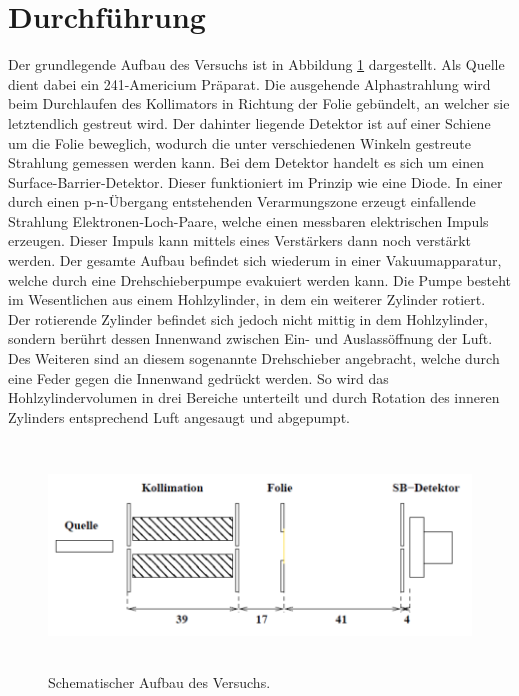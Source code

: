 \section{Durchführung}
\label{sec:Durchführung}

Der grundlegende Aufbau des Versuchs ist in Abbildung \ref{fig:aufbau} dargestellt.
Als Quelle dient dabei ein 241-Americium Präparat. Die ausgehende Alphastrahlung
wird beim Durchlaufen des Kollimators in Richtung der Folie gebündelt, an welcher
sie letztendlich gestreut wird. Der dahinter liegende Detektor ist auf einer Schiene
um die Folie beweglich, wodurch die unter verschiedenen Winkeln gestreute Strahlung
gemessen werden kann. Bei dem Detektor handelt es sich um einen Surface-Barrier-Detektor.
Dieser funktioniert im Prinzip wie eine Diode. In einer durch einen p-n-Übergang
entstehenden Verarmungszone erzeugt einfallende Strahlung Elektronen-Loch-Paare,
welche einen messbaren elektrischen Impuls erzeugen. Dieser Impuls kann mittels eines
Verstärkers dann noch verstärkt werden.
Der gesamte Aufbau befindet sich wiederum in einer Vakuumapparatur, welche
durch eine Drehschieberpumpe evakuiert werden kann. Die Pumpe besteht im Wesentlichen
aus einem Hohlzylinder, in dem ein weiterer Zylinder rotiert. Der rotierende Zylinder
befindet sich jedoch nicht mittig in dem Hohlzylinder, sondern berührt dessen Innenwand
zwischen Ein- und Auslassöffnung der Luft. Des Weiteren sind an diesem sogenannte
Drehschieber angebracht, welche durch eine Feder gegen die Innenwand gedrückt werden.
So wird das Hohlzylindervolumen in drei Bereiche unterteilt und durch Rotation des
inneren Zylinders entsprechend Luft angesaugt und abgepumpt.

\begin{figure}[H]
  \centering
  \includegraphics[height=6cm]{Aufbau.PNG}
  \caption{Schematischer Aufbau des Versuchs. \cite{sample1}}
  \label{fig:aufbau}
\end{figure}

